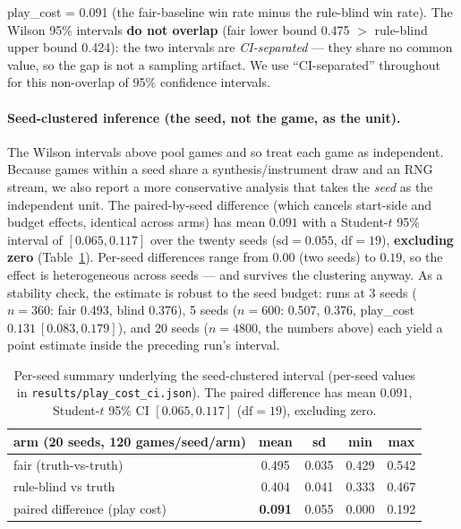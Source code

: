 \documentclass[11pt]{article}
\theoremstyle{remark}
\begin{document}
play\_cost = 0.091 (the fair-baseline win rate minus the rule-blind win rate). The Wilson 95\% intervals \textbf{do not overlap} (fair lower bound 0.475 $>$ rule-blind upper bound 0.424): the two intervals are \emph{CI-separated} --- they share no common value, so the gap is not a sampling artifact. We use ``CI-separated'' throughout for this non-overlap of 95\% confidence intervals.

\paragraph{Seed-clustered inference (the seed, not the game, as the unit).} The Wilson intervals above pool games and so treat each game as independent. Because games within a seed share a synthesis/instrument draw and an RNG stream, we also report a more conservative analysis that takes the \emph{seed} as the independent unit. The paired-by-seed difference (which cancels start-side and budget effects, identical across arms) has mean $0.091$ with a Student-$t$ 95\% interval of $[0.065, 0.117]$ over the twenty seeds ($\mathrm{sd} = 0.055$, $\mathrm{df} = 19$), \textbf{excluding zero} (Table~\ref{tab:perseed}). Per-seed differences range from $0.00$ (two seeds) to $0.19$, so the effect is heterogeneous across seeds --- and survives the clustering anyway. As a stability check, the estimate is robust to the seed budget: runs at 3 seeds ($n=360$: fair 0.493, blind 0.376), 5 seeds ($n=600$: 0.507, 0.376, play\_cost $0.131~[0.083, 0.179]$), and 20 seeds ($n=4800$, the numbers above) each yield a point estimate inside the preceding run's interval.

\begin{table}[ht]
\centering
\small
\begin{tabular}{lcccc}
\toprule
arm (20 seeds, 120 games/seed/arm) & mean & sd & min & max \\
\midrule
fair (truth-vs-truth)  & 0.495 & 0.035 & 0.429 & 0.542 \\
rule-blind vs truth    & 0.404 & 0.041 & 0.333 & 0.467 \\
paired difference (play cost) & \textbf{0.091} & 0.055 & 0.000 & 0.192 \\
\bottomrule
\end{tabular}
\caption{Per-seed summary underlying the seed-clustered interval (per-seed values in \texttt{results/play\_cost\_ci.json}). The paired difference has mean $0.091$, Student-$t$ 95\% CI $[0.065, 0.117]$ ($\mathrm{df}=19$), excluding zero.}
\label{tab:perseed}
\end{table}
\end{document}
